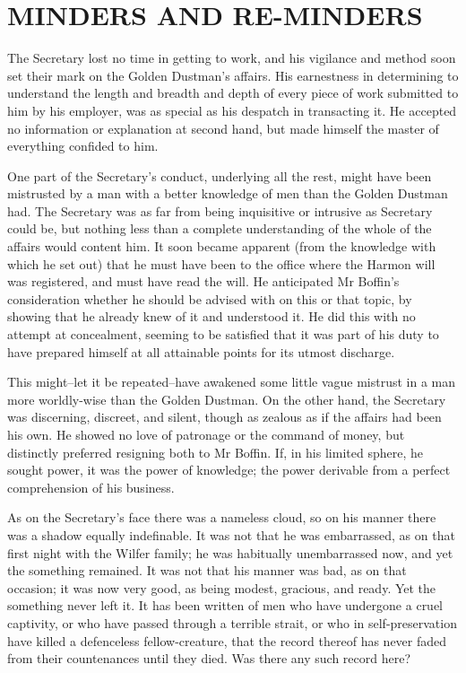 
\chapter{MINDERS AND RE-MINDERS}

The Secretary lost no time in getting to work, and his vigilance
and method soon set their mark on the Golden Dustman’s affairs. His
earnestness in determining to understand the length and breadth and
depth of every piece of work submitted to him by his employer, was as
special as his despatch in transacting it. He accepted no information
or explanation at second hand, but made himself the master of everything
confided to him.

One part of the Secretary’s conduct, underlying all the rest, might have
been mistrusted by a man with a better knowledge of men than the
Golden Dustman had. The Secretary was as far from being inquisitive
or intrusive as Secretary could be, but nothing less than a complete
understanding of the whole of the affairs would content him. It soon
became apparent (from the knowledge with which he set out) that he must
have been to the office where the Harmon will was registered, and must
have read the will. He anticipated Mr Boffin’s consideration whether he
should be advised with on this or that topic, by showing that he
already knew of it and understood it. He did this with no attempt at
concealment, seeming to be satisfied that it was part of his duty to
have prepared himself at all attainable points for its utmost discharge.

This might--let it be repeated--have awakened some little vague mistrust
in a man more worldly-wise than the Golden Dustman. On the other hand,
the Secretary was discerning, discreet, and silent, though as zealous as
if the affairs had been his own. He showed no love of patronage or the
command of money, but distinctly preferred resigning both to Mr
Boffin. If, in his limited sphere, he sought power, it was the power
of knowledge; the power derivable from a perfect comprehension of his
business.

As on the Secretary’s face there was a nameless cloud, so on his
manner there was a shadow equally indefinable. It was not that he was
embarrassed, as on that first night with the Wilfer family; he was
habitually unembarrassed now, and yet the something remained. It was not
that his manner was bad, as on that occasion; it was now very good, as
being modest, gracious, and ready. Yet the something never left it. It
has been written of men who have undergone a cruel captivity, or who
have passed through a terrible strait, or who in self-preservation have
killed a defenceless fellow-creature, that the record thereof has never
faded from their countenances until they died. Was there any such record
here?


